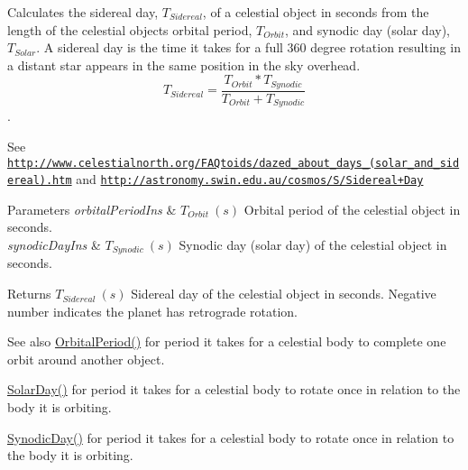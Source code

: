 Calculates the sidereal day, $T_{Sidereal}$, of a celestial object in seconds from the length of the celestial object\textquotesingle{}s orbital period, $T_{Orbit}$, and synodic day (solar day), $T_{Solar}$. A sidereal day is the time it takes for a full 360 degree rotation resulting in a distant star appears in the same position in the sky overhead. \[ T_{Sidereal}=\dfrac{T_{Orbit} * T_{Synodic}}{T_{Orbit} + T_{Synodic}}\]. 

See \href{http://www.celestialnorth.org/FAQtoids/dazed_about_days_(solar_and_sidereal).htm}{\tt http\+://www.\+celestialnorth.\+org/\+F\+A\+Qtoids/dazed\+\_\+about\+\_\+days\+\_\+(solar\+\_\+and\+\_\+sidereal).\+htm} and \href{http://astronomy.swin.edu.au/cosmos/S/Sidereal+Day}{\tt http\+://astronomy.\+swin.\+edu.\+au/cosmos/\+S/\+Sidereal+\+Day}


\begin{DoxyParams}{Parameters}
{\em orbital\+Period\+Ins} & $ T_{Orbit}\ (s)$ Orbital period of the celestial object in seconds. \\
\hline
{\em synodic\+Day\+Ins} & $ T_{Synodic}\ (s)$ Synodic day (solar day) of the celestial object in seconds. \\
\hline
\end{DoxyParams}
\begin{DoxyReturn}{Returns}
$ T_{Sidereal}\ (s)$ Sidereal day of the celestial object in seconds. Negative number indicates the planet has retrograde rotation. 
\end{DoxyReturn}
\begin{DoxySeeAlso}{See also}
\mbox{\hyperlink{group___e_g_x_phys-_astrophysic-_orbital_period_ga76aac7afe3b7a30a785259e9eeb0c139}{Orbital\+Period()}} for period it takes for a celestial body to complete one orbit around another object. 

\mbox{\hyperlink{group___e_g_x_phys-_astrophysic-_solar_day_gae321e0dd0c031a57c45b15dc819635e0}{Solar\+Day()}} for period it takes for a celestial body to rotate once in relation to the body it is orbiting. 

\mbox{\hyperlink{group___e_g_x_phys-_astrophysic-_synodic_day_ga637140842bc008c87d90e65b551cbac7}{Synodic\+Day()}} for period it takes for a celestial body to rotate once in relation to the body it is orbiting. 
\end{DoxySeeAlso}
